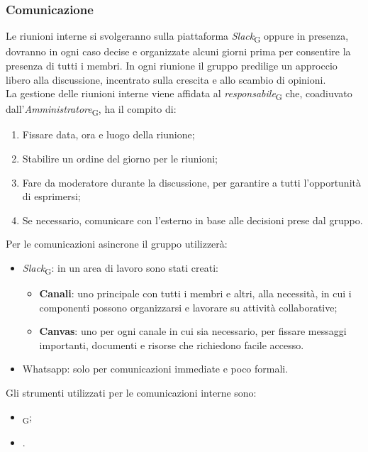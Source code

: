\subsubsection{Comunicazione}
Le riunioni interne si svolgeranno sulla piattaforma \textit{Slack}\textsubscript{G} oppure in presenza, dovranno in ogni caso decise e organizzate alcuni giorni prima per consentire la presenza di tutti i membri. In ogni riunione il gruppo predilige un approccio libero alla discussione, incentrato sulla crescita e allo scambio di opinioni. \\
La gestione delle riunioni interne viene affidata al \textit{responsabile}\textsubscript{G} che, coadiuvato dall'\textit{Amministratore}\textsubscript{G}, ha il compito di:
\begin{enumerate}
    \item Fissare data, ora e luogo della riunione;
    \item Stabilire un ordine del giorno per le riunioni;
    \item Fare da moderatore durante la discussione, per garantire a tutti l'opportunità di esprimersi;
    \item Se necessario, comunicare con l'esterno in base alle decisioni prese dal gruppo.
\end{enumerate}
Per le comunicazioni asincrone il gruppo utilizzerà:
\begin{itemize}
    \item \textit{Slack}\textsubscript{G}: in un area di lavoro sono stati creati:
            \begin{itemize}
                \item \textbf{Canali}: uno principale con tutti i membri e altri, alla necessità, in cui i componenti possono organizzarsi e lavorare su attività collaborative;
                \item \textbf{Canvas}: uno per ogni canale in cui sia necessario, per fissare messaggi importanti, documenti e risorse che richiedono facile accesso.
            \end{itemize}
    \item Whatsapp: solo per comunicazioni immediate e poco formali.
\end{itemize}
Gli strumenti utilizzati per le comunicazioni interne sono:
\begin{itemize}
    \item \textit{}\textsubscript{G};
    \item {}.
\end{itemize}


